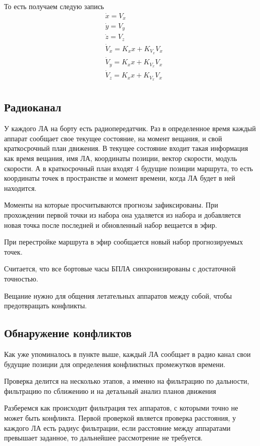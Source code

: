 \documentclass[a4paper,12pt]{article}
\begin{document}
То есть получаем следую запись
\begin{align*}
    &\dot{x} = V_x\\
    &\dot{y} = V_y\\
    &\dot{z} = V_z\\
    &\dot{V}_x = K_x x + K_{V_x} V_x\\
    &\dot{V}_y = K_x x + K_{V_x} V_x\\
    &\dot{V}_z = K_x x + K_{V_x} V_x\\
\end{align*}



\subsection{Радиоканал}
У каждого ЛА на борту есть радиопередатчик. Раз в определенное время каждый аппарат сообщает свое текущее состояние, на момент вещания, и свой краткосрочный план движения. В текущее состояние входит такая информация как время вещания, имя ЛА, координаты позиции, вектор скорости, модуль скорости. А в краткосрочный план входят 4 будущие позиции маршрута, то есть координаты точек в пространстве и момент времени, когда ЛА будет в ней находится. 

Моменты на которые просчитываются прогнозы зафиксированы. При прохождении первой точки из набора она удаляется из набора и добавляется новая точка после последней и обновленный набор вещается в эфир.

При перестройке маршрута в эфир сообщается новый набор прогнозируемых точек.

Считается, что все бортовые часы БПЛА синхронизированы с достаточной точностью.

Вещание нужно для общения летательных аппаратов между собой, чтобы предотвращать конфликты.

\subsection{Обнаружение конфликтов}
Как уже упоминалось в пункте выше, каждый ЛА сообщает в радио канал свои будущие позиции для определения конфликтных промежутков времени.

Проверка делится на несколько этапов, а именно на фильтрацию по дальности, фильтрацию по сближению и на детальный анализ планов движения

Разберемся как происходит фильтрация тех аппаратов, с которыми точно не может быть конфликта. 
Первой проверкой является проверка расстояния, у каждого ЛА есть радиус фильтрации, если расстояние между аппаратами превышает заданное, то дальнейшее рассмотрение не требуется. 
\end{document}
